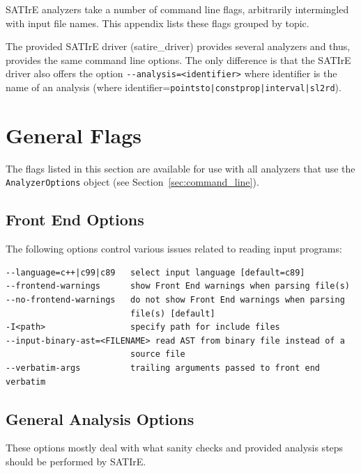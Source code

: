 \documentclass[a4paper,12pt]{report}
\begin{document}
SATIrE analyzers take a number of command line flags, arbitrarily
intermingled with input file names. This appendix lists these flags grouped
by topic.

The provided SATIrE driver (satire\_driver) provides several analyzers
and thus, provides the same command line options. The only difference
is that the SATIrE driver also offers the option
\verb+--analysis=<identifier>+ where identifier is the name of an
analysis (where identifier=\verb+pointsto|constprop|interval|sl2rd+).

\section{General Flags}
\label{sec:general_flags}

The flags listed in this section are available for use with all analyzers
that use the \texttt{AnalyzerOptions} object (see
Section~\ref{sec:command_line}).

\subsection{Front End Options}

The following options control various issues related to reading input
programs:
{\footnotesize
\begin{verbatim}
--language=c++|c99|c89   select input language [default=c89]
--frontend-warnings      show Front End warnings when parsing file(s)
--no-frontend-warnings   do not show Front End warnings when parsing
                         file(s) [default]
-I<path>                 specify path for include files
--input-binary-ast=<FILENAME> read AST from binary file instead of a
                         source file
--verbatim-args          trailing arguments passed to front end verbatim
\end{verbatim}
}

\subsection{General Analysis Options}

These options mostly deal with what sanity checks and provided analysis
steps should be performed by SATIrE.
\end{document}
